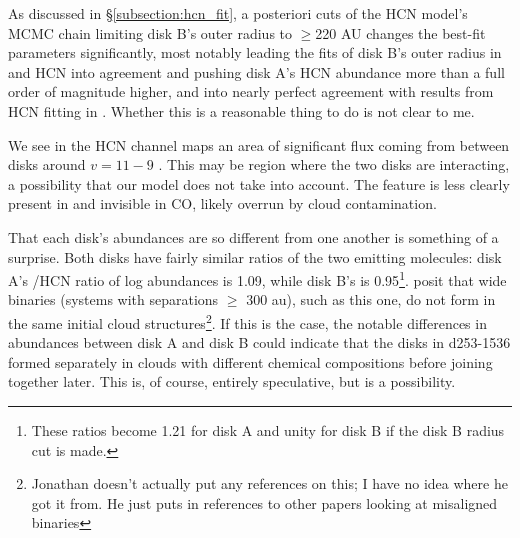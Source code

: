 As discussed in \S\ref{subsection:hcn_fit}, a posteriori cuts of the HCN model's MCMC chain limiting disk B's outer radius to $\geq$220 AU changes the best-fit parameters significantly, most notably leading the fits of disk B's outer radius in \hco and HCN into agreement and pushing disk A's HCN abundance more than a full order of magnitude higher, and into nearly perfect agreement with results from HCN fitting in \citet{Factor2017}. Whether this is a reasonable thing to do is not clear to me.

We see in the HCN channel maps an area of significant flux coming from between disks around $ v = 11-9$ \kms. This may be region where the two disks are interacting, a possibility that our model does not take into account. The feature is less clearly present in \hco and invisible in CO, likely overrun by cloud contamination.


That each disk's abundances are so different from one another is something of a surprise. Both disks have fairly similar ratios of the two emitting molecules: disk A's \hco/HCN ratio of log abundances is 1.09, while disk B's is 0.95\footnote{These ratios become 1.21 for disk A and unity for disk B if the disk B radius cut is made.}. \citet{Williams2014} posit that wide binaries (systems with separations $\geq$ 300 au), such as this one, do not form in the same initial cloud structures\footnote{Jonathan doesn't actually put any references on this; I have no idea where he got it from. He just puts in references to other papers looking at misaligned binaries}. If this is the case, the notable differences in abundances between disk A and disk B could indicate that the disks in d253-1536 formed separately in clouds with different chemical compositions before joining together later. This is, of course, entirely speculative, but is a possibility.




